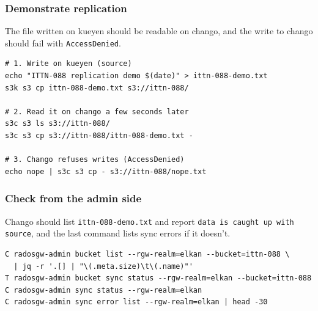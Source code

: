 \subsubsection{Demonstrate replication}

The file written on kueyen should be readable on chango, and the write to chango should fail with \texttt{AccessDenied}.

{\small
\begin{verbatim}
# 1. Write on kueyen (source)
echo "ITTN-088 replication demo $(date)" > ittn-088-demo.txt
s3k s3 cp ittn-088-demo.txt s3://ittn-088/

# 2. Read it on chango a few seconds later
s3c s3 ls s3://ittn-088/
s3c s3 cp s3://ittn-088/ittn-088-demo.txt -

# 3. Chango refuses writes (AccessDenied)
echo nope | s3c s3 cp - s3://ittn-088/nope.txt
\end{verbatim}
}

\subsubsection{Check from the admin side}

Chango should list \texttt{ittn-088-demo.txt} and report \texttt{data is caught up with source}, and the last command lists sync errors if it doesn't.

{\small
\begin{verbatim}
C radosgw-admin bucket list --rgw-realm=elkan --bucket=ittn-088 \
  | jq -r '.[] | "\(.meta.size)\t\(.name)"'
T radosgw-admin bucket sync status --rgw-realm=elkan --bucket=ittn-088
C radosgw-admin sync status --rgw-realm=elkan
C radosgw-admin sync error list --rgw-realm=elkan | head -30
\end{verbatim}
}
